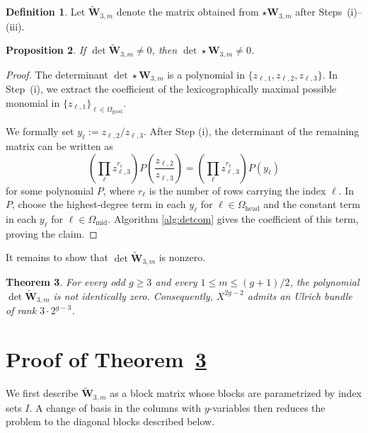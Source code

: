 \documentclass[12pt, letterpaper]{amsart}
\newtheorem{theorem}{Theorem}[section]
\newtheorem{proposition}[theorem]{Proposition}
\theoremstyle{definition}
\newtheorem{definition}[theorem]{Definition}
\newcommand{\bW}{\mathbf{W} }
\newcommand{\Om}{\Omega}
\begin{document}
\begin{definition}\label{def:tildeW}
Let \(\widetilde{\bW}_{3,m}\) denote the matrix obtained from \(\star\bW_{3,m}\) after Steps~(i)--(iii).
\end{definition}

\begin{proposition}\label{prop:rk3_reduction}
If \(\det \widetilde{\bW}_{3,m}\ne 0\), then \(\det \star\bW_{3,m}\ne 0\).
\end{proposition}

\begin{proof}
The determinant \(\det \star \bW_{3,m}\) is a polynomial in \(\{z_{\ell, 1}, z_{\ell, 2}, z_{\ell, 3}\}\). In Step~(i), we extract the coefficient of the lexicographically maximal possible monomial in \(\{z_{\ell, 1}\}_{\ell \in \Om_{\mathrm{good}}}\).

We formally set \(y_\ell := z_{\ell, 2}/z_{\ell, 3}\). After Step (i), the determinant of the remaining matrix can be written as
\[\left(\prod_{\ell}z_{\ell, 3}^{r_\ell}\right)P\left(\frac{z_{\ell,2}}{z_{\ell,3}}\right) = \left(\prod_{\ell}z_{\ell, 3}^{r_\ell}\right)P\left(y_{\ell}\right)\]
for some polynomial \(P\), where \(r_\ell\) is the number of rows carrying the index \(\ell\). In \(P\), choose the highest-degree term in each \(y_{\ell}\) for \(\ell \in \Om_{\mathrm{head}}\) and the constant term in each \(y_{\ell}\) for \(\ell \in \Om_{\mathrm{mid}}\). Algorithm \ref{alg:detcom} gives the coefficient of this term, proving the claim.
\end{proof}

It remains to show that \(\det \widetilde{\bW}_{3,m}\) is nonzero.

\begin{theorem}\label{thm:rk3_main}
For every odd \(g\ge3\) and every \(1\le m\le(g+1)/2\), the polynomial \(\det \widetilde{\bW}_{3,m}\) is not identically zero. Consequently, \(X^{2g-2}\) admits an Ulrich bundle of rank \(3\cdot2^{g-3}\).
\end{theorem}

\section{Proof of Theorem~\ref{thm:rk3_main}}\label{sec:prf_main_thm}

We first describe \(\widetilde{\bW}_{3,m}\) as a block matrix whose blocks are parametrized by index sets \(I\). A change of basis in the columns with \(y\)-variables then reduces the problem to the diagonal blocks described below.
\end{document}
